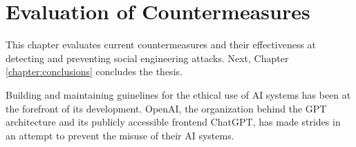 



\chapter{Evaluation of Countermeasures\label{chapter:evaluation}}
\begin{comment}

Guides:
    - Rest of the thesis (thesis max of 20 - other chapters and pages)
    - Fill the thesis with content in this chapter

TODO:
    [ ] 

What to cover:
    -
    
Literature:
    - 

\end{comment}

This chapter  evaluates current countermeasures and their effectiveness at detecting and preventing social engineering attacks. Next, Chapter \ref{chapter:conclusions} concludes the thesis.

Building and maintaining guinelines for the ethical use of AI systems has been at the forefront of its development. OpenAI, the organization behind the GPT architecture and its publicly accessible frontend ChatGPT, has made strides in an attempt to prevent the misuse of their AI systems.







